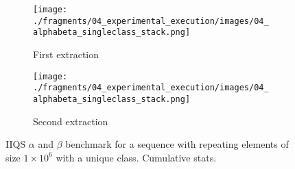 \begin{figure}
    \centering
    \begin{subfigure}[b]{0.45\textwidth}
        \centering
        \texttt{[image: ./fragments/04\_experimental\_execution/images/04\_alphabeta\_singleclass\_stack.png]}%
        \caption{First extraction}
        \label{FIG:05_ALPHABETA_RELATIONSHIP_SINGLECLASS_STACK__0_0}
    \end{subfigure}
    \begin{subfigure}[b]{0.45\textwidth}
        \centering
        \texttt{[image: ./fragments/04\_experimental\_execution/images/04\_alphabeta\_singleclass\_stack.png]}%
        \caption{Second extraction}
        \label{FIG:05_ALPHABETA_RELATIONSHIP_SINGLECLASS_STACK__0_1}
    \end{subfigure}



    
    \caption{IIQS $\alpha$ and $\beta$ benchmark for a sequence with repeating elements of size $1\times10^6$ with a unique class. Cumulative stats.}
    \label{FIG:05_ALPHABETA_RELATIONSHIP_SINGLECLASS_STACK}
\end{figure}



